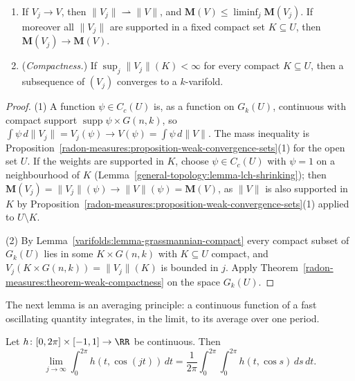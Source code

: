 \begin{proposition}\label{varifolds:proposition-varifold-convergence}
\begin{enumerate}
\item If $V_j \to V$, then $\|V_j\| \rightharpoonup \|V\|$, and $\mathbf{M}(V) \leq \liminf_j\mathbf{M}(V_j)$. If moreover all $\|V_j\|$ are supported in a fixed compact set $K \subseteq U$, then
$\mathbf{M}(V_j) \to \mathbf{M}(V)$.
\item (\emph{Compactness.}) If $\sup_j\|V_j\|(K) < \infty$ for every compact $K \subseteq U$, then a subsequence of $(V_j)$ converges to a $k$-varifold.
\end{enumerate}
\end{proposition}

\begin{proof}
(1) A function $\psi \in C_c(U)$ is, as a function on $G_k(U)$, continuous with compact support $\operatorname{supp}\psi \times G(n, k)$, so $\int\psi\,d\|V_j\| = V_j(\psi) \to V(\psi) = \int\psi\,d\|V\|$. The
mass inequality is Proposition~\ref{radon-measures:proposition-weak-convergence-sets}(1) for the open set $U$. If the weights are supported in $K$, choose $\psi \in C_c(U)$ with $\psi = 1$ on a neighbourhood
of $K$ (Lemma~\ref{general-topology:lemma-lch-shrinking}); then $\mathbf{M}(V_j) = \|V_j\|(\psi) \to \|V\|(\psi) = \mathbf{M}(V)$, as $\|V\|$ is also supported in $K$ by
Proposition~\ref{radon-measures:proposition-weak-convergence-sets}(1) applied to $U \setminus K$.

(2) By Lemma~\ref{varifolds:lemma-grassmannian-compact} every compact subset of $G_k(U)$ lies in some $K \times G(n, k)$ with $K \subseteq U$ compact, and $V_j(K \times G(n, k)) = \|V_j\|(K)$ is bounded in
$j$. Apply Theorem~\ref{radon-measures:theorem-weak-compactness} on the space $G_k(U)$.
\end{proof}

The next lemma is an averaging principle: a continuous function of a fast oscillating quantity integrates, in the limit, to its average over one period.

\begin{lemma}\label{varifolds:lemma-averaging}
Let $h \colon [0, 2\pi] \times [-1, 1] \to \RR$ be continuous. Then
\[
\lim_{j \to \infty}\int_0^{2\pi}h(t, \cos(jt))\,dt = \frac1{2\pi}\int_0^{2\pi}\int_0^{2\pi}h(t, \cos s)\,ds\,dt .
\]
\end{lemma}

